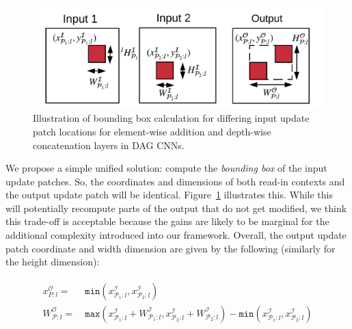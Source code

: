 \begin{figure}[t]
\vspace{-2mm}
\includegraphics[width=\columnwidth]{images/la_operators}
\caption{Illustration of bounding box calculation for differing input update patch locations for element-wise addition and depth-wise concatenation layers in DAG CNNs.}
\label{fig:la_operators}
\vspace{-4mm}
\end{figure}

We propose a simple unified solution: compute the \textit{bounding box} of the input update patches. So, the coordinates and dimensions of both read-in contexts and the output update patch will be identical. Figure~\ref{fig:la_operators} illustrates this. While this will potentially recompute parts of the output that do not get modified, we think this trade-off is acceptable because the gains are likely to be marginal for the additional complexity introduced into our framework. Overall, the output update patch coordinate and width dimension are given by the following (similarly for the height dimension):

\vspace{-2mm}
\begin{align}
\begin{split}
x^\mathcal{O}_{P:l} =&~ \texttt{min}(x^\mathcal{I}_{\mathcal{P}_1:l}, x^\mathcal{I}_{\mathcal{P}_2:l})\\
W^\mathcal{O}_{\mathcal{P}:l} =&~ \texttt{max}(x^\mathcal{I}_{\mathcal{P}_1:l}+W^\mathcal{I}_{\mathcal{P}_1:l},x^\mathcal{I}_{\mathcal{P}_2:l}+W^\mathcal{I}_{\mathcal{P}_2:l}) -\texttt{min}(x^\mathcal{I}_{\mathcal{P}_1:l},x^\mathcal{I}_{\mathcal{P}_2:l})
\end{split}
\end{align}

